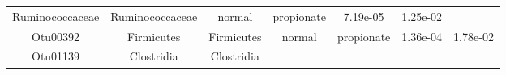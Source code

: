 \documentclass[11pt,]{article}
\begin{document}
\begin{longtable}[]{@{}ccccccc@{}}
\begin{minipage}[t]{0.17\columnwidth}
Ruminococcaceae\strut
\end{minipage} & \begin{minipage}[t]{0.17\columnwidth}\centering\strut
Ruminococcaceae\strut
\end{minipage} & \begin{minipage}[t]{0.09\columnwidth}\centering\strut
normal\strut
\end{minipage} & \begin{minipage}[t]{0.11\columnwidth}\centering\strut
propionate\strut
\end{minipage} & \begin{minipage}[t]{0.09\columnwidth}\centering\strut
7.19e-05\strut
\end{minipage} & \begin{minipage}[t]{0.09\columnwidth}\centering\strut
1.25e-02\strut
\end{minipage}\tabularnewline
\begin{minipage}[t]{0.09\columnwidth}\centering\strut
Otu00392\strut
\end{minipage} & \begin{minipage}[t]{0.17\columnwidth}\centering\strut
Firmicutes\strut
\end{minipage} & \begin{minipage}[t]{0.17\columnwidth}\centering\strut
Firmicutes\strut
\end{minipage} & \begin{minipage}[t]{0.09\columnwidth}\centering\strut
normal\strut
\end{minipage} & \begin{minipage}[t]{0.11\columnwidth}\centering\strut
propionate\strut
\end{minipage} & \begin{minipage}[t]{0.09\columnwidth}\centering\strut
1.36e-04\strut
\end{minipage} & \begin{minipage}[t]{0.09\columnwidth}\centering\strut
1.78e-02\strut
\end{minipage}\tabularnewline
\begin{minipage}[t]{0.09\columnwidth}\centering\strut
Otu01139\strut
\end{minipage} & \begin{minipage}[t]{0.17\columnwidth}\centering\strut
Clostridia\strut
\end{minipage} & \begin{minipage}[t]{0.17\columnwidth}\centering\strut
Clostridia\strut
\end{minipage} & \begin{minipage}[t]{0.09\columnwidth}\centering\strut

\end{minipage}
\end{longtable}
\end{document}
